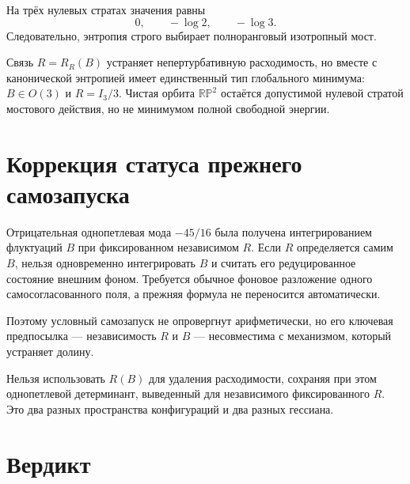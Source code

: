 На трёх нулевых стратах значения равны
\begin{equation}
 0,\qquad -\log2,\qquad -\log3.
\end{equation}
Следовательно, энтропия строго выбирает полноранговый изотропный мост.

\begin{theorem}
Связь $R=R_R(B)$ устраняет непертурбативную расходимость, но вместе с
канонической энтропией имеет единственный тип глобального минимума:
$B\in O(3)$ и $R=I_3/3$. Чистая орбита $\mathbb{RP}^2$ остаётся
допустимой нулевой стратой мостового действия, но не минимумом полной
свободной энергии.
\end{theorem}

\section{Коррекция статуса прежнего самозапуска}

Отрицательная однопетлевая мода $-45/16$ была получена интегрированием
флуктуаций $B$ при фиксированном независимом $R$. Если $R$ определяется
самим $B$, нельзя одновременно интегрировать $B$ и считать его
редуцированное состояние внешним фоном. Требуется обычное фоновое
разложение одного самосогласованного поля, а прежняя формула не переносится
автоматически.

Поэтому условный самозапуск не опровергнут арифметически, но его ключевая
предпосылка --- независимость $R$ и $B$ --- несовместима с механизмом,
который устраняет долину.

\begin{nogocriterion}
Нельзя использовать $R(B)$ для удаления расходимости, сохраняя при этом
однопетлевой детерминант, выведенный для независимого фиксированного $R$.
Это два разных пространства конфигураций и два разных гессиана.
\end{nogocriterion}

\section{Вердикт}

